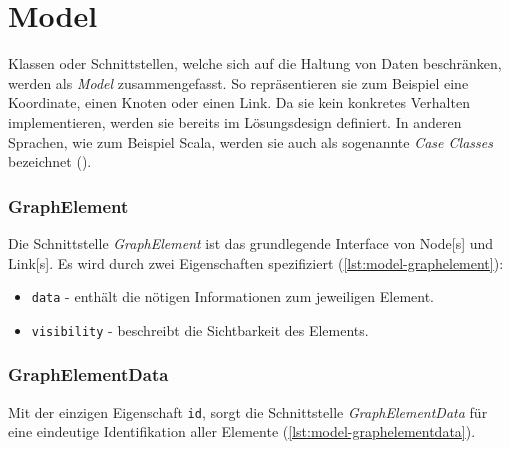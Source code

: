 
\section{Model}\label{model}
Klassen oder Schnittstellen, welche sich auf die Haltung von Daten beschränken, %
werden als \textit{Model} zusammengefasst. So repräsentieren sie zum Beispiel eine Koordinate, einen Knoten oder einen Link. Da sie kein konkretes Verhalten implementieren, werden sie bereits im Lösungsdesign definiert. In anderen Sprachen, wie zum Beispiel \gls{Scala}, werden sie auch als sogenannte \textit{Case Classes} bezeichnet (\citep{caseClass}).

\subsubsection{GraphElement}
\label{GraphElement}
Die Schnittstelle \textit{GraphElement} ist das grundlegende Interface von \gls{Node}[s] und \gls{Link}[s]. Es wird durch zwei Eigenschaften spezifiziert (\autoref{lst:model-graphelement}):

\begin{itemize}
  \item \texttt{data} - enthält die nötigen Informationen zum jeweiligen Element. 
  \item \texttt{visibility} - beschreibt die Sichtbarkeit des Elements.
\end{itemize}


\subsubsection{GraphElementData}
\label{GraphElementData}
Mit der einzigen Eigenschaft \texttt{id}, sorgt die Schnittstelle \textit{GraphElementData} für eine eindeutige Identifikation aller Elemente (\autoref{lst:model-graphelementdata}). 

